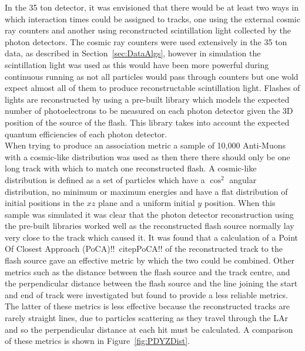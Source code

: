 In the 35 ton detector, it was envisioned that there would be at least two ways in which interaction times could be assigned to tracks, one using the external cosmic ray counters and another using reconstructed scintillation light collected by the photon detectors. The cosmic ray counters were used extensively in the 35 ton data, as described in Section~\ref{sec:DataAlgs}, however in simulation the scintillation light was used as this would have been more powerful during continuous running as not all particles would pass through counters but one wold expect almost all of them to produce reconstructable scintillation light. Flashes of lights are reconstructed by using a pre-built library which models the expected number of photoelectrons to be measured on each photon detector given the 3D position of the source of the flash. This library takes into account the expected quantum efficiencies of each photon detector. \\

When trying to produce an association metric a sample of 10,000 Anti-Muons with a cosmic-like distribution was used as then there there should only be one long track with which to match one reconstructed flash. A cosmic-like distribution is defined as a set of particles which have a $\cos^{2}$ angular distribution, no minimum or maximum energies and have a flat distribution of initial positions in the $xz$ plane and a uniform initial $y$ position. When this sample was simulated it was clear that the photon detector reconstruction using the pre-built libraries worked well as the reconstructed flash source normally lay very close to the track which caused it. It was found that a calculation of a Point Of Closest Approach (PoCA)!!~citep{PoCA}!! of the reconstructed track to the flash source gave an effective metric by which the two could be combined. Other metrics such as the distance between the flash source and the track centre, and the perpendicular distance between the flash source and the line joining the start and end of track were investigated but found to provide a less reliable metrics. The latter of these metrics is less effective because the reconstructed tracks are rarely straight lines, due to particles scattering as they travel through the LAr and so the perpendicular distance at each hit must be calculated. A comparison of these metrics is shown in Figure~\ref{fig:PDYZDist}. \\

